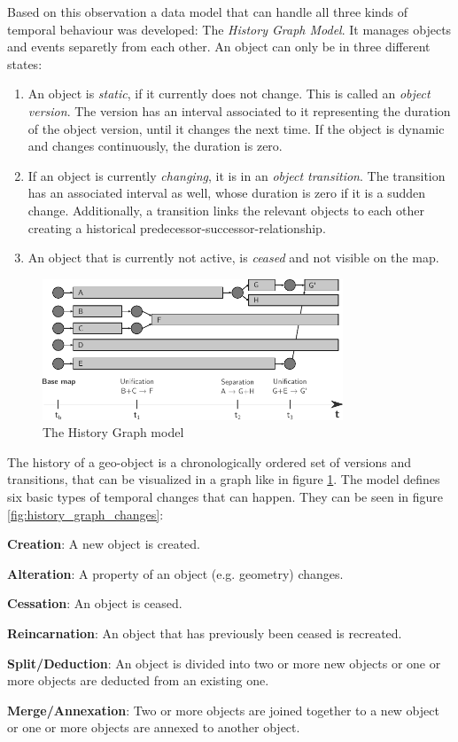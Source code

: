Based on this observation a data model that can handle all three kinds of temporal behaviour was developed: The \emph{History Graph Model}. It manages objects and events separetly from each other. An object can only be in three different states:
\begin{enumerate}
  \item An object is \emph{static}, if it currently does not change. This is called an \emph{object version}. The version has an interval associated to it representing the duration of the object version, until it changes the next time. If the object is dynamic and changes continuously, the duration is zero.
  \item If an object is currently \emph{changing}, it is in an \emph{object transition}. The transition has an associated interval as well, whose duration is zero if it is a sudden change. Additionally, a transition links the relevant objects to each other creating a historical predecessor-successor-relationship.
  \item An object that is currently not active, is \emph{ceased} and not visible on the map.
\end{enumerate}

\begin{figure}[H]
  \centering
  \includegraphics[width=0.8\textwidth]{graphics/basics/stdm/history_graph_model}
  \caption{The History Graph model}
  \label{fig:history_graph_model}
\end{figure}

The history of a geo-object is a chronologically ordered set of versions and transitions, that can be visualized in a graph like in figure \ref{fig:history_graph_model}.
The model defines six basic types of temporal changes that can happen. They can be seen in figure \ref{fig:history_graph_changes}:

\begin{compactitem}
  \item \textbf{Creation}:           A new object is created.
  \item \textbf{Alteration}:         A property of an object (e.g. geometry) changes.
  \item \textbf{Cessation}:          An object is ceased.
  \item \textbf{Reincarnation}:      An object that has previously been ceased is recreated.
  \item \textbf{Split/Deduction}:    An object is divided into two or more new objects or one or more objects are deducted from an existing one.
  \item \textbf{Merge/Annexation}:   Two or more objects are joined together to a new object or one or more objects are annexed to another object.
\end{compactitem}

